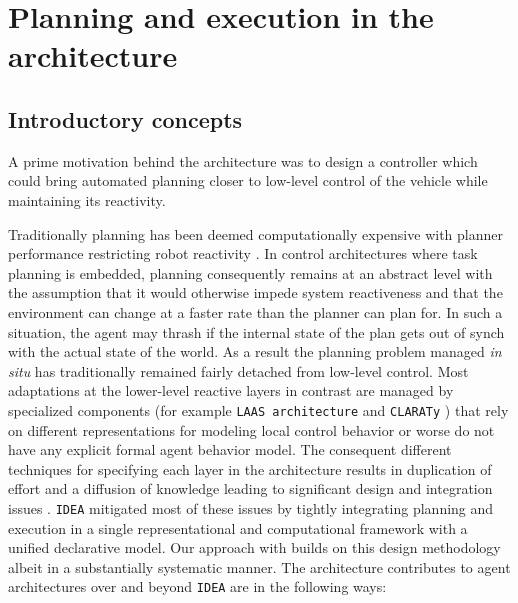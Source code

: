 \section{Planning and execution in the \rx architecture}
\label{sec:arch}

\subsection{Introductory concepts}
\label{sec:arch:intro}

A prime motivation behind the \rx architecture was to design a
controller which could bring automated planning closer to low-level
control of the vehicle while maintaining its reactivity. 

Traditionally planning has been deemed computationally expensive with
planner performance restricting robot reactivity
\cite{ghallab04,Dias:2003ua}. In control architectures where task
planning is embedded, planning consequently remains at an abstract
level with the assumption that it would otherwise impede system
reactiveness and that the environment can change at a faster rate than
the planner can plan for. In such a situation, the agent may thrash if
the internal state of the plan gets out of synch with the actual state
of the world. As a result the planning problem managed {\em in situ}
has traditionally remained fairly detached from low-level
control. Most adaptations at the lower-level reactive layers in
contrast are managed by specialized components (for example
\texttt{LAAS architecture} \cite{alami:1998p820,Ingrand07} and
\texttt{CLARATy} \cite{Nesnas:2003do}) that rely on different
representations for modeling local control behavior or worse do not
have any explicit formal agent behavior model. The consequent
different techniques for specifying each layer in the architecture
results in duplication of effort and a diffusion of knowledge leading
to significant design and integration issues \cite{DS1report}.
\texttt{IDEA} mitigated most of these issues by tightly integrating
planning and execution in a single representational and computational
framework with a unified declarative model. Our approach with \rx
builds on this design methodology albeit in a substantially systematic
manner. The \rx architecture contributes to agent architectures over
and beyond \texttt{IDEA} are in the following ways:


